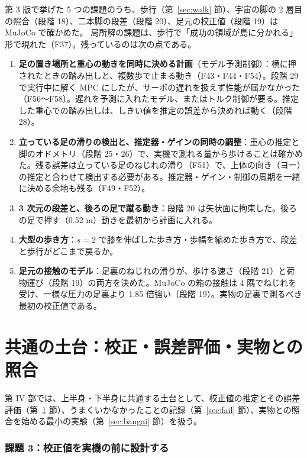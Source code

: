 \documentclass[paper=a4paper,fontsize=10pt,twocolumn,column_gap=2zw,line_length=24zw,number_of_lines=46,head_space=20mm]{jlreq}
\begin{document}
第 3 版で挙げた 5 つの課題のうち、歩行（第~\ref{sec:walk} 節）、宇宙の脚の 2 層目の照合（段階 18）、二本脚の段差（段階 20）、足元の校正値（段階 19）は MuJoCo で確かめた。
局所解の課題は、歩行で「成功の領域が島に分かれる」形で現れた（F37）。残っているのは次の点である。
\begin{enumerate}\setlength{\itemsep}{0pt}
\item \textbf{足の置き場所と重心の動きを同時に決める計画}（モデル予測制御）：横に押されたときの踏み出しと、複数歩で止まる動き（F43・F44・F54）。段階 29 で実行中に解く MPC にしたが、サーボの遅れを扱えず性能が届かなかった（F56〜F58）。遅れを予測に入れたモデル、またはトルク制御が要る。推定した重心での踏み出しは、しきい値を推定の誤差から決めれば動く（段階 28）。
\item \textbf{立っている足の滑りの検出と、推定器・ゲインの同時の調整}：重心の推定と脚のオドメトリ（段階 25・26）で、実機で測れる量から歩けることは確かめた。残る誤差は立っている足のねじれの滑り（F51）で、上体の向き（ヨー）の推定と合わせて検出する必要がある。推定器・ゲイン・制御の周期を一緒に決める余地も残る（F49・F52）。
\item \textbf{3 次元の段差と、後ろの足で蹴る動き}：段階 20 は矢状面に拘束した。後ろの足で押す（0.52 m）動きを最初から計画に入れる。
\item \textbf{大型の歩き方}：$s=2$ で膝を伸ばした歩き方・歩幅を縮めた歩き方で、段差と歩行がどこまで戻るか。
\item \textbf{足元の接触のモデル}：足裏のねじれの滑りが、歩ける速さ（段階 21）と荷物運び（段階 19）の両方を決めた。MuJoCo の箱の接触は 4 隅でねじれを受け、一様な圧力の足裏より 1.85 倍強い（段階 19）。実物の足裏で測るべき最初の校正値である。
\end{enumerate}

\part{共通の土台：校正・誤差評価・実物との照合}

第 IV 部では、上半身・下半身に共通する土台として、校正値の推定とその誤差評価（第~\ref{sec:calib} 節）、うまくいかなかったことの記録（第~\ref{sec:fail} 節）、実物との照合を始める最小の実験（第~\ref{sec:bangai} 節）を扱う。

\section{課題 3：校正値を実機の前に設計する}\label{sec:calib}
\end{document}
